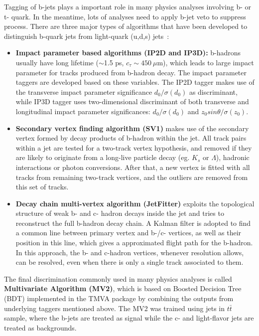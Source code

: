 Tagging of b-jets plays a important role in many physics analyses involving b- or t- quark.
In the meantime, lots of analyses need to apply b-jet veto to suppress \ttbar process.
There are three major types of algorithms that have been developed to distinguish b-quark jets from light-quark (u,d,s) jets~\cite{ATL-PHYS-PUB-2016-012}:
\begin{itemize}
	\item \textbf{Impact parameter based algorithms (IP2D and IP3D):} b-hadrons usually have long lifetime ($\sim$1.5 ps, $c_{\tau}\sim450~\mu$m), which leads to large impact parameter for tracks produced from b-hadron decay. The impact parameter taggers are developed based on these variables. The IP2D tagger makes use of the transverse impact parameter significance $d_{0}/\sigma(d_{0})$ as discriminant, while IP3D tagger uses two-dimensional discriminant of both transverse and longitudinal impact parameter significances: $d_{0}/\sigma(d_{0})$ and $z_{0}sin\theta/\sigma(z_{0})$.
	\item \textbf{Secondary vertex finding algorithm (SV1)} makes use of the secondary vertex formed by decay products of b-hadron within the jet. All track pairs within a jet are tested for a two-track vertex hypothesis, and removed if they are likely to originate from a long-live particle decay (eg. $K_{s}$ or $\Lambda$), hadronic interactions or photon conversions. After that, a new vertex is fitted with all tracks from remaining two-track vertices, and the outliers are removed from this set of tracks.
	\item \textbf{Decay chain multi-vertex algorithm (JetFitter)}\cite{Piacquadio_2008} exploits the topological structure of weak b- and c- hadron decays inside the jet and tries to reconstruct the full b-hadron decay chain. A Kalman filter is adopted to find a common line between primary vertex and b-/c- vertices, as well as their position in this line, which gives a approximated flight path for the b-hadron. In this approach, the b- and c-hadron vertices, whenever resolution allows, can be resolved, even when there is only a single track associated to them.
\end{itemize}
The final discrimination commonly used in many physics analyses is called \textbf{Multivariate Algorithm (MV2)}, which is based on Boosted Decision Tree (BDT) implemented in the TMVA package\cite{Speckmayer_2010} by combining the outputs from underlying taggers mentioned above.
The MV2 was trained using jets in $t\bar{t}$ sample, where the b-jets are treated as signal while the c- and light-flavor jets are treated as backgrounds.

